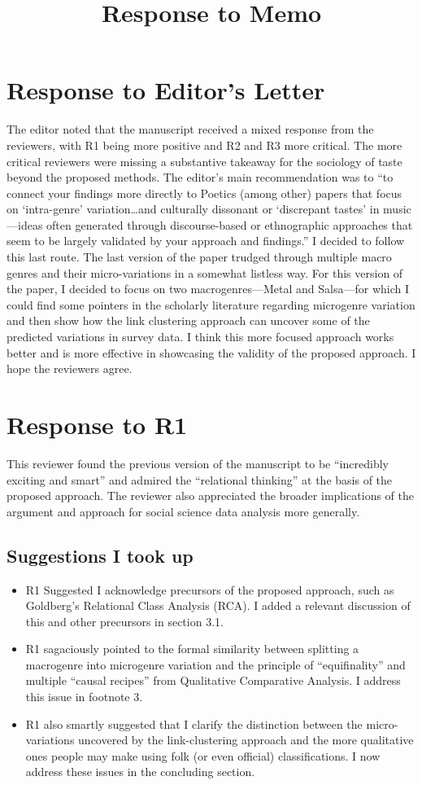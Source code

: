 \documentclass[a4paper,12pt]{extarticle}
\title{Response to Memo}
\begin{document}
\maketitle
\section{Response to Editor's Letter}
The editor noted that the manuscript received a mixed response from the reviewers, with R1 being more positive and R2 and R3 more critical. The more critical reviewers were missing a substantive takeaway for the sociology of taste beyond the proposed methods. The editor's main recommendation was to ``to connect your findings more directly to Poetics (among other) papers that focus on `intra-genre' variation\ldots and culturally dissonant or `discrepant tastes' in music ---ideas often generated through discourse-based or ethnographic approaches that seem to be largely validated by your approach and findings.'' I decided to follow this last route. The last version of the paper trudged through multiple macro genres and their micro-variations in a somewhat listless way. For this version of the paper, I decided to focus on two macrogenres---Metal and Salsa---for which I could find some pointers in the scholarly literature regarding microgenre variation and then show how the link clustering approach can uncover some of the predicted variations in survey data. I think this more focused approach works better and is more effective in showcasing the validity of the proposed approach. I hope the reviewers agree.

\section{Response to R1}
This reviewer found the previous version of the manuscript to be ``incredibly exciting and smart'' and admired the ``relational thinking'' at the basis of the proposed approach. The reviewer also appreciated the broader implications of the argument and approach for social science data analysis more generally.

\subsection{Suggestions I took up}
\begin{itemize}
    \item R1 Suggested I acknowledge precursors of the proposed approach, such as Goldberg's Relational Class Analysis (RCA). I added a relevant discussion of this and other precursors in section 3.1.  
    \item R1 sagaciously pointed to the formal similarity between splitting a macrogenre into microgenre variation and the principle of ``equifinality'' and multiple ``causal recipes'' from Qualitative Comparative Analysis. I address this issue in footnote 3.  
    \item R1 also smartly suggested that I clarify the distinction between the micro-variations uncovered by the link-clustering approach and the more qualitative ones people may make using folk (or even official) classifications. I now address these issues in the concluding section. 
\end{itemize}
\end{document}
